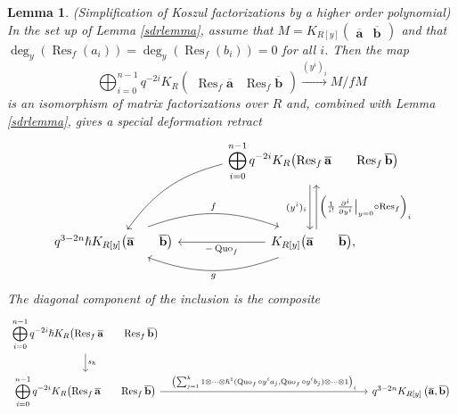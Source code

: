\documentclass{article}
\DeclareMathOperator{\Res}{Res}
\DeclareMathOperator{\Quo}{Quo}
\newcommand{\kmf}[2]{
	K_{#1}{\begin{pmatrix}
			#2
		\end{pmatrix}
	}	
}
\theoremstyle{plain} %
\newtheorem{lemma}[theorem]{Lemma}
\theoremstyle{definition} %
\theoremstyle{remark} %
\begin{document}
\begin{lemma}\label{lemma:sdrkoszul}\emph{(Simplification of Koszul factorizations by a higher order polynomial)}
	In the set up of Lemma \ref{sdrlemma}, assume that $M=\kmf{R[y]}{\mathbf{\overline a} &\mathbf{\overline b}}$ and that $\deg_y(\Res_f(a_i))=\deg_y(\Res_f(b_i))=0$ for all $i$. Then the map
	$$
		\displaystyle\bigoplus_{i=0}^{n-1}q^{-2i}\kmf{R}{\Res_f\mathbf{\overline a} & \Res_f\mathbf{\overline b}} 
		\xrightarrow{(y^i)_i}
		M/fM
	$$ 
	is an isomorphism of matrix factorizations over $R$ and, combined with Lemma \ref{sdrlemma}, gives a special deformation retract
	$$
		\begin{tikzcd}[column sep=large, ]
			&
			\displaystyle\bigoplus_{i=0}^{n-1}q^{-2i} \kmf{R}{\Res_f\mathbf{\overline a} & \Res_f\mathbf{\overline b}} 
			\ar[dd, shift right=0.6ex, "(y^i)_i", swap]
			\ar[dd, leftarrow, shift left=0.6ex, "\left(\frac{1}{i!}\left.\frac{\partial^i}{\partial y^i}\right|_{y=0}\circ 	\Res_f\right)_i"]
			\arrow[ddl, "{}", bend right=20, swap]
			\\
			\\
			q^{3-2n}\hslash \kmf{R[y]}{\mathbf{\overline a} & \mathbf{\overline b}}
			\arrow[r, "f", shift left=0.5ex, bend left=20]
			& 
			\kmf{R[y]}{\mathbf{\overline a} & \mathbf{\overline b}}
			\ar[l, "-\Quo_f"]
			\arrow[l, "g", shift left=0.5ex, bend left=20]
			, 
		\end{tikzcd}
	$$
	The diagonal component of the inclusion is the composite
	$$
	\begin{tikzcd}[column sep=7cm]
		\displaystyle\bigoplus_{i=0}^{n-1}q^{-2i}\hslash\kmf{R}{\Res_f\mathbf{\overline a} & \Res_f\mathbf{\overline b}} 
		\arrow[d,"s_\hslash"] 
		&
		\\
		\displaystyle\bigoplus_{i=0}^{n-1}q^{-2i}\kmf{R}{\Res_f\mathbf{\overline a} & \Res_f\mathbf{\overline b}} 
		\arrow[r, "{\left(\sum_{j=1}^k1\otimes\cdots \otimes\hslash^1(\Quo_f\circ y^i a_j,\Quo_f\circ y^i b_j)\otimes\cdots\otimes 1\right)_i}"] 
		& 
		q^{3-2n}K_{R[y]}\left(\mathbf{\overline a},\mathbf{\overline b}\right) 
	\end{tikzcd}
	$$
\end{lemma}
\end{document}
